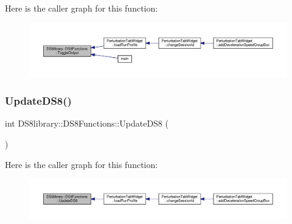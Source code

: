 Here is the caller graph for this function\+:
\nopagebreak
\begin{figure}[H]
\begin{center}
\leavevmode
\includegraphics[width=350pt]{class_d_s8library_1_1_d_s8_functions_a62ae825413cda1f339d17a9d0e50bd14_icgraph}
\end{center}
\end{figure}
\mbox{\label{class_d_s8library_1_1_d_s8_functions_a0e915e3a8b2dae57f07ce6a6642a026e}} 
\subsubsection{\texorpdfstring{Update\+D\+S8()}{UpdateDS8()}}
{\footnotesize\ttfamily int D\+S8library\+::\+D\+S8\+Functions\+::\+Update\+D\+S8 (\begin{DoxyParamCaption}{ }\end{DoxyParamCaption})}

Here is the caller graph for this function\+:
\nopagebreak
\begin{figure}[H]
\begin{center}
\leavevmode
\includegraphics[width=350pt]{class_d_s8library_1_1_d_s8_functions_a0e915e3a8b2dae57f07ce6a6642a026e_icgraph}
\end{center}
\end{figure}
\mbox{\label{class_d_s8library_1_1_d_s8_functions_ad422873da361a8050340604eacd8a0ac}} 
